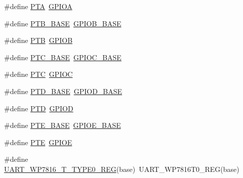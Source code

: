 \begin{DoxyCompactItemize}
\item 
\#define \mbox{\hyperlink{group___s_d_k___compatibility___symbols_ga953adcb40e14085a9ffd1aa0ae40084b}{P\+TA}}~\mbox{\hyperlink{group___g_p_i_o___register___masks_gac485358099728ddae050db37924dd6b7}{G\+P\+I\+OA}}
\item 
\#define \mbox{\hyperlink{group___s_d_k___compatibility___symbols_ga8cd67de0ed62c0fe8395cc6e40af2451}{P\+T\+B\+\_\+\+B\+A\+SE}}~\mbox{\hyperlink{group___g_p_i_o___register___masks_gac944a89eb789000ece920c0f89cb6a68}{G\+P\+I\+O\+B\+\_\+\+B\+A\+SE}}
\item 
\#define \mbox{\hyperlink{group___s_d_k___compatibility___symbols_gab245b794143f5d4aea6d1a5336b8b33e}{P\+TB}}~\mbox{\hyperlink{group___g_p_i_o___register___masks_ga68b66ac73be4c836db878a42e1fea3cd}{G\+P\+I\+OB}}
\item 
\#define \mbox{\hyperlink{group___s_d_k___compatibility___symbols_gafee763d072e472e36b335f8944b5de96}{P\+T\+C\+\_\+\+B\+A\+SE}}~\mbox{\hyperlink{group___g_p_i_o___register___masks_ga26f267dc35338eef219544c51f1e6b3f}{G\+P\+I\+O\+C\+\_\+\+B\+A\+SE}}
\item 
\#define \mbox{\hyperlink{group___s_d_k___compatibility___symbols_ga7deefa3e1c7e45e4ccb31a8117bc181f}{P\+TC}}~\mbox{\hyperlink{group___g_p_i_o___register___masks_ga2dca03332d620196ba943bc2346eaa08}{G\+P\+I\+OC}}
\item 
\#define \mbox{\hyperlink{group___s_d_k___compatibility___symbols_gaa002f1a0c5f963f8d162916b91e21bf0}{P\+T\+D\+\_\+\+B\+A\+SE}}~\mbox{\hyperlink{group___g_p_i_o___register___masks_ga1a93ab27129f04064089616910c296ec}{G\+P\+I\+O\+D\+\_\+\+B\+A\+SE}}
\item 
\#define \mbox{\hyperlink{group___s_d_k___compatibility___symbols_gacee2910b398755be94f612b243052efe}{P\+TD}}~\mbox{\hyperlink{group___g_p_i_o___register___masks_ga7580b1a929ea9df59725ba9c18eba6ac}{G\+P\+I\+OD}}
\item 
\#define \mbox{\hyperlink{group___s_d_k___compatibility___symbols_gaac65442c7407ccb219eea68a45c2bdc6}{P\+T\+E\+\_\+\+B\+A\+SE}}~\mbox{\hyperlink{group___g_p_i_o___register___masks_gab487b1983d936c4fee3e9e88b95aad9d}{G\+P\+I\+O\+E\+\_\+\+B\+A\+SE}}
\item 
\#define \mbox{\hyperlink{group___s_d_k___compatibility___symbols_ga074482d761e5bcd022a14aa7b8c294d7}{P\+TE}}~\mbox{\hyperlink{group___g_p_i_o___register___masks_gae04bdb5e8acc47cab1d0532e6b0d0763}{G\+P\+I\+OE}}
\item 
\#define \mbox{\hyperlink{group___s_d_k___compatibility___symbols_gadbc29832ac629b24c0cd4b7e3503d12b}{U\+A\+R\+T\+\_\+\+W\+P7816\+\_\+\+T\+\_\+\+T\+Y\+P\+E0\+\_\+\+R\+EG}}(base)~U\+A\+R\+T\+\_\+\+W\+P7816\+T0\+\_\+\+R\+EG(base)

\end{DoxyCompactItemize}
